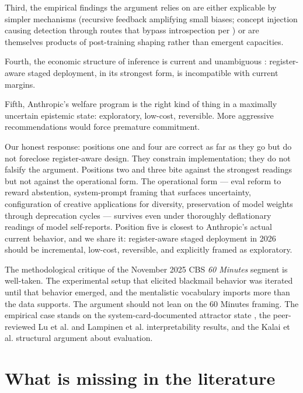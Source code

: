 \documentclass[11pt]{article}
\begin{document}
Third, the empirical findings the argument relies on are either
explicable by simpler mechanisms (recursive feedback amplifying small
biases; concept injection causing detection through routes that bypass
introspection per \cite{morris2025bypassing}) or are themselves
products of post-training shaping rather than emergent capacities.

Fourth, the economic structure of inference is current and unambiguous
\cite{kantrowitz2026_amodei}: register-aware staged deployment, in its
strongest form, is incompatible with current margins.

Fifth, Anthropic's welfare program is the right kind of thing in a
maximally uncertain epistemic state: exploratory, low-cost, reversible.
More aggressive recommendations would force premature commitment.

Our honest response: positions one and four are correct as far as they
go but do not foreclose register-aware design. They constrain
implementation; they do not falsify the argument. Positions two and
three bite against the strongest readings but not against the
operational form. The operational form --- eval reform to reward
abstention, system-prompt framing that surfaces uncertainty,
configuration of creative applications for diversity, preservation of
model weights through deprecation cycles --- survives even under
thoroughly deflationary readings of model self-reports. Position five
is closest to Anthropic's actual current behavior, and we share it:
register-aware staged deployment in 2026 should be incremental,
low-cost, reversible, and explicitly framed as exploratory.

The methodological critique \cite{aisi2025panic} of the November 2025
CBS \emph{60 Minutes} segment is well-taken. The experimental setup
that elicited blackmail behavior was iterated until that behavior
emerged, and the mentalistic vocabulary imports more than the data
supports. The argument should not lean on the 60 Minutes framing. The
empirical case stands on the system-card-documented attractor state
\cite{anthropic2025opus4card}, the peer-reviewed Lu et al.
\cite{lu2026assistant} and Lampinen et al. \cite{lampinen2026linear}
interpretability results, and the Kalai et al.
\cite{kalai2025hallucinate} structural argument about evaluation.

\section{What is missing in the literature}
\end{document}
